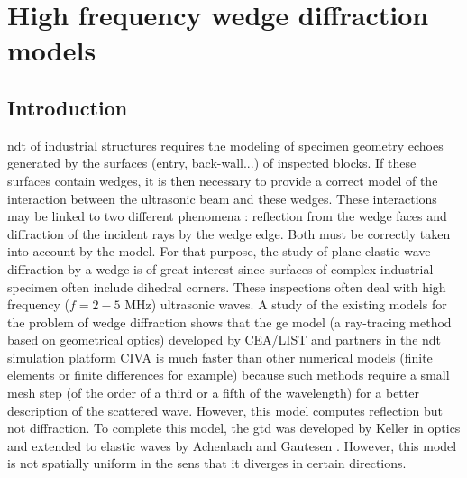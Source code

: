 \chapter[][State of the Art]{High frequency wedge diffraction models}
\label{chap-biblio}

\section*{Introduction}
\acrfull{ndt} of industrial structures requires the modeling of specimen geometry echoes generated by the surfaces (entry, back-wall...) of inspected blocks. If these surfaces contain wedges, it is then necessary to provide a correct model of the interaction between the ultrasonic beam and these wedges. These interactions may be linked to two different phenomena : reflection from the wedge faces and diffraction of the incident rays by the wedge edge. Both must be correctly taken into account by the model. For that purpose, the study of plane elastic wave diffraction by a wedge is of great interest since surfaces of complex industrial specimen often include dihedral corners.
These inspections often deal with high frequency ($f=2-5$ MHz) ultrasonic waves. A study of the existing models for the problem of wedge diffraction shows that the \acrfull{ge} model (a ray-tracing method based on geometrical optics) developed by CEA/LIST and partners in the \acrshort{ndt} simulation platform CIVA \cite{Darmonspec} is much faster than other numerical models (finite elements or finite differences for example) because such methods require a small mesh step (of the order of a third or a fifth of the wavelength) for a better description of the scattered wave. However, this model computes reflection but not diffraction. To complete this model, the \acrfull{gtd} was developed by Keller \cite{GTD} in optics and extended to elastic waves by Achenbach and Gautesen \cite{AchenbachGautesen, Achenbach}. However, this model is not spatially uniform in the sens that it diverges in certain directions. 

